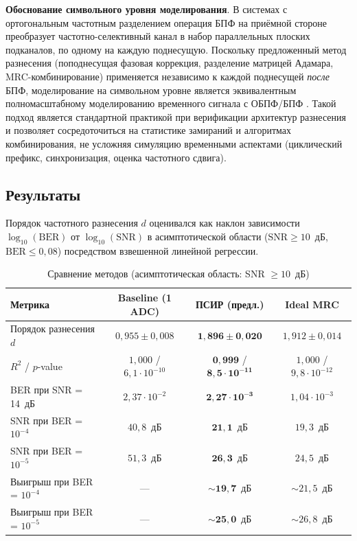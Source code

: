 \documentclass[a4paper,12pt]{article}
\numberwithin{equation}{section}
\begin{document}
\textbf{Обоснование символьного уровня моделирования}. 
В системах с ортогональным частотным разделением операция БПФ на приёмной стороне 
преобразует частотно-селективный канал в набор параллельных плоских подканалов, 
по одному на каждую поднесущую. Поскольку предложенный метод разнесения 
(поподнесущая фазовая коррекция, разделение матрицей Адамара, MRC-комбинирование) 
применяется независимо к каждой поднесущей \textit{после} БПФ, моделирование 
на символьном уровне является эквивалентным полномасштабному моделированию 
временного сигнала с ОБПФ/БПФ \cite{proakis}. Такой подход является стандартной 
практикой при верификации архитектур разнесения и позволяет сосредоточиться 
на статистике замираний и алгоритмах комбинирования, не усложняя симуляцию 
временными аспектами (циклический префикс, синхронизация, оценка частотного сдвига).

\subsection{Результаты}
\label{subsec:sim_results}

Порядок частотного разнесения $d$ оценивался как наклон зависимости $\log_{10}(\text{BER})$ от $\log_{10}(\text{SNR})$ в асимптотической области ($\text{SNR} \ge 10$~дБ, $\text{BER} \le 0{,}08$) посредством взвешенной линейной регрессии.

\begin{table}[htbp]
\centering
\caption{Сравнение методов (асимптотическая область: SNR $\ge 10$~дБ)}
\label{tab:results}
\begin{tabular}{lccc}
\toprule
\textbf{Метрика} & \textbf{Baseline (1 ADC)} & \textbf{ПСИР (предл.)} & \textbf{Ideal MRC} \\
\midrule
Порядок разнесения $d$ & $0{,}955 \pm 0{,}008$ & $\mathbf{1{,}896 \pm 0{,}020}$ & $1{,}912 \pm 0{,}014$ \\
$R^2$ / $p$-value & $1{,}000$ / $6{,}1\cdot10^{-10}$ & $\mathbf{0{,}999}$ / $\mathbf{8{,}5\cdot10^{-11}}$ & $1{,}000$ / $9{,}8\cdot10^{-12}$ \\
BER при SNR = 14~дБ & $2{,}37\cdot10^{-2}$ & $\mathbf{2{,}27\cdot10^{-3}}$ & $1{,}04\cdot10^{-3}$ \\
SNR при BER = $10^{-4}$ & $40{,}8$~дБ & $\mathbf{21{,}1}$~дБ & $19{,}3$~дБ \\
SNR при BER = $10^{-5}$ & $51{,}3$~дБ & $\mathbf{26{,}3}$~дБ & $24{,}5$~дБ \\
Выигрыш при BER = $10^{-4}$ & --- & $\mathbf{\sim 19{,}7}$~дБ & $\sim 21{,}5$~дБ \\
Выигрыш при BER = $10^{-5}$ & --- & $\mathbf{\sim 25{,}0}$~дБ & $\sim 26{,}8$~дБ \\
\bottomrule
\end{tabular}
\end{table}
\end{document}
